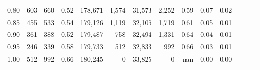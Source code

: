 \begin{tabular}{rrrrrrrrrrrrrr}
0.80 &     603 &    660 &  0.52 &  178,671 &    1,574 &  31,573 &   2,252 &  0.59 &  0.07 &      0.02 \\
0.85 &     455 &    533 &  0.54 &  179,126 &    1,119 &  32,106 &   1,719 &  0.61 &  0.05 &      0.01 \\
0.90 &     361 &    388 &  0.52 &  179,487 &      758 &  32,494 &   1,331 &  0.64 &  0.04 &      0.01 \\
0.95 &     246 &    339 &  0.58 &  179,733 &      512 &  32,833 &     992 &  0.66 &  0.03 &      0.01 \\
1.00 &     512 &    992 &  0.66 &  180,245 &        0 &  33,825 &       0 &   nan &  0.00 &      0.00 \\
\bottomrule
\end{tabular}
